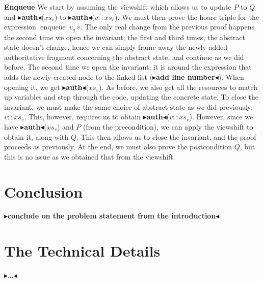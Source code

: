 \documentclass[twoside,11pt,openright]{report}
\newcommand{\enqueue}{\operatorname{enqueue}}
\newcommand{\todo}[1]{{\color[rgb]{.5,0,0}\textbf{$\blacktriangleright$#1$\blacktriangleleft$}}}
\begin{document}
\textbf{Enqueue} We start by assuming the viewshift which allows us to update $P$ to $Q$ and \todo{auth}($xs_v$) to \todo{auth}($v :: xs_v$). We must then prove the hoare triple for the expression $\enqueue \ v_q \ v$. The only real change from the previous proof happens the second time we open the invariant; the first and third times, the abstract state doesn't change, hence we can simply frame away the newly added authoritative fragment concerning the abstract state, and continue as we did before. The second time we open the invariant, it is around the expression that adds the newly created node to the linked list (\todo{add line number}). When opening it, we get \todo{auth}($xs_v$). As before, we also get all the resources to match up variables and step through the code, updating the concrete state. To close the invariant, we must make the same choice of abstract state as we did previously: $v :: xs_v$. This, however, requires us to obtain \todo{auth}($v :: xs_v$). However, since we have \todo{auth}($xs_v$) and $P$ (from the precondition), we can apply the viewshift to obtain it, along with $Q$. This then allows us to close the invariant, and the proof proceeds as previously. At the end, we must also prove the postcondition $Q$, but this is no issue as we obtained that from the viewshift.



\chapter{Conclusion}
\label{ch:conclusion}

\todo{conclude on the problem statement from the introduction}


\cleardoublepage
{}
 



\cleardoublepage
\appendix
\chapter{The Technical Details}

\todo{\dots}
\end{document}

